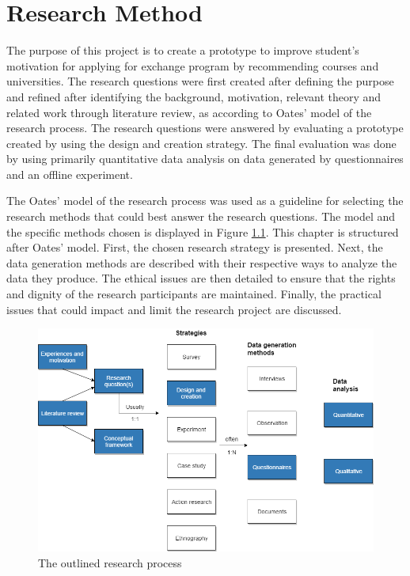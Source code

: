 
\chapter{Research Method}\label{chap:4}

The purpose of this project is to create a prototype to improve student's motivation for applying for exchange program by recommending courses and universities. The research questions were first created after defining the purpose and refined after identifying the background, motivation, relevant theory and related work through literature review, as according to Oates' model \cite{oates2005researching} of the research process. The research questions were answered by evaluating a prototype created by using the design and creation strategy. The final evaluation was done by using primarily quantitative data analysis on data generated by questionnaires and an offline experiment.

The Oates'\cite{oates2005researching} model of the research process was used as a guideline for selecting the research methods that could best answer the research questions. The model and the specific methods chosen is displayed in Figure \ref{fig:research_process}. This chapter is structured after Oates' model. First, the chosen research strategy is presented. Next, the data generation methods are described with their respective ways to analyze the data they produce. The ethical issues are then detailed to ensure that the rights and dignity of the research participants are maintained. Finally, the practical issues that could impact and limit the research project are discussed. 

\begin{figure}[H]
    \centering
    \includegraphics[width=1\textwidth]{fig/research_process.png}
    \caption{The outlined research process}
    \label{fig:research_process}
\end{figure}



